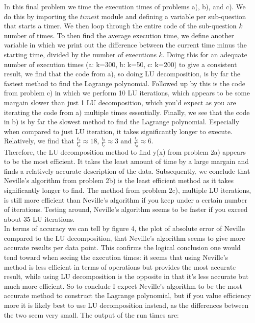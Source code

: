 In this final problem we time the execution times of problems a), b), and c). We do this by importing the $\textit{timeit}$ module and defining a variable per sub-question that starts a timer. We then loop through the entire code of the sub-question $k$ number of times. To then find the average execution time, we define another variable in which we print out the difference between the current time minus the starting time, divided by the number of executions $k$. Doing this for an adequate number of execution times (a: k=300, b: k=50, c: k=200) to give a consistent result, we find that the code from a), so doing LU decomposition, is by far the fastest method to find the Lagrange polynomial. Followed up by this is the code from problem c) in which we perform 10 LU iterations, which appears to be some margain slower than just 1 LU decomposition, which you'd expect as you are iterating the code from a) multiple times essentially. Finally, we see that the code in b) is by far the slowest method to find the Lagrange polynomial. Especially when compared to just LU iteration, it takes significantly longer to execute. Relatively, we find that $\frac{t_b}{t_a} \approx 18$, $\frac{t_b}{t_c} \approx 3$ and $\frac{t_c}{t_a} \approx 6$.\\

Therefore, the LU decomposition method to find y(x) from problem 2a) appears to be the most efficient. It takes the least amount of time by a large margain and finds a relatively accurate description of the data. Subsequently, we conclude that Neville's algorithm from problem 2b) is the least efficient method as it takes significantly longer to find. The method from problem 2c), multiple LU iterations, is still more efficient than Neville's algorithm if you keep under a certain number of iterations. Testing around, Neville's algorithm seems to be faster if you exceed about 35 LU iterations.\\

In terms of accuracy we can tell by figure 4, the plot of absolute error of Neville compared to the LU decomposition, that Neville's algorithm seems to give more accurate results per data point. This confirms the logical conclusion one would tend toward when seeing the execution times: it seems that using Neville's method is less efficient in terms of operations but provides the most accurate result, while using LU decomposition is the opposite in that it's less accurate but much more efficient. So to conclude I expect Neville's algorithm to be the most accurate method to construct the Lagrange polynomial, but if you value efficiency more it is likely best to use LU decomposition instead, as the differences between the two seem very small. The output of the run times are:\\

